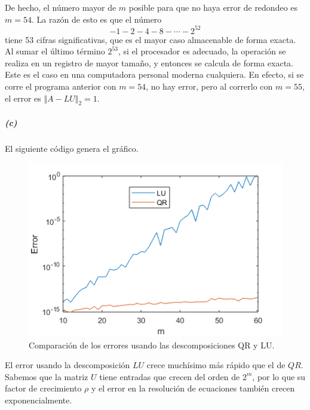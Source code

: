 De hecho, el número mayor de $m$ posible para que no haya error de redondeo es $m=54$. La razón de esto es que el número
\[
	-1-2-4-8-\dotsb-2^{52}
\]
tiene 53 cifras significativas, que es el mayor caso almacenable de forma exacta. Al sumar el último término $2^{53}$, si el procesador es adecuado, la operación se realiza en un registro de mayor tamaño, y entonces se calcula de forma exacta. Este es el caso en una computadora personal moderna cualquiera. En efecto, si se corre el programa anterior con $m=54$, no hay error, pero al correrlo con $m=55$, el error es $\Vert A-LU\Vert_2=1$.

\subparagraph{(c)} El siguiente código genera el gráfico.


\begin{figure}[H]
	\centering
	\includegraphics{ejer6bc.png}
	\caption{Comparación de los errores usando las descomposiciones QR y LU.}
\end{figure}

El error usando la descomposición $LU$ crece muchísimo más rápido que el de $QR$. Sabemos que la matriz $U$ tiene entradas que crecen del orden de $2^{m}$, por lo que su factor de crecimiento $\rho$ y el error en la resolución de ecuaciones también crecen exponencialmente.

